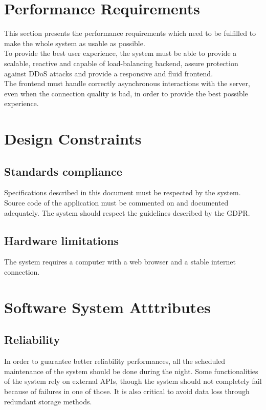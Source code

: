\section{Performance Requirements}
This section presents the performance requirements which need to be fulfilled to make the
whole system as usable as possible.\\
To provide the best user experience, the system must be able to provide a scalable, reactive 
and capable of load-balancing backend, assure protection against DDoS attacks and provide a 
responsive and fluid frontend.\\
The frontend must handle correctly asynchronous interactions with the server, even when the 
connection quality is bad, in order to provide the best possible experience.\\

\section{Design Constraints}

\subsection{Standards compliance}
Specifications described in this document must be respected by the system. Source code of the application
must be commented on and documented adequately. The system should respect the guidelines described
by the GDPR.\\

\subsection{Hardware limitations}
The system requires a computer with a web browser and a stable internet connection.\\


\section{Software System Atttributes}

\subsection{Reliability}
In order to guarantee better reliability performances, all the scheduled maintenance of the system should
be done during the night. Some functionalities of the system rely on external APIs, though the system should 
not completely fail because of failures in one of those. It is also critical to avoid data loss through 
redundant storage methods.

